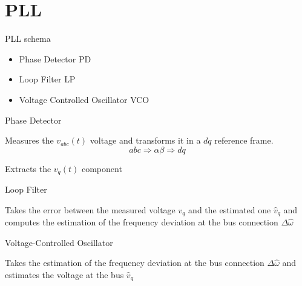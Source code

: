 \documentclass[aspectratio=169, 12pt]{beamer}
\begin{document}
\section{PLL}  
\begin{frame}{PLL schema}{\insertsection}
  \begin{figure}
     
  \end{figure}
\begin{itemize}
  \item Phase Detector \textcolor{NTNUBlue}{PD}
  \item Loop Filter \textcolor{NTNUBlue}{LP}
  \item Voltage Controlled Oscillator \textcolor{NTNUBlue}{VCO}
\end{itemize}
\end{frame}

\begin{frame}{Phase Detector}{\insertsection}
  \begin{figure}
     
  \end{figure}
  Measures the $v_{abc}(t)$ voltage and \textcolor{NTNUBlue}{transforms} it in a $dq$ reference frame.
  \begin{equation*}
    abc \Rightarrow \alpha\beta \Rightarrow dq
  \end{equation*}

  Extracts the $v_q(t)$ component
\end{frame}

\begin{frame}{Loop Filter}{\insertsection}
  \begin{figure}
     
  \end{figure}
 Takes the error between the measured voltage $v_q$ and the estimated one $\hat{v}_q$ and computes the estimation of the frequency deviation at the bus connection $\Delta \hat{\omega}$
\end{frame}

\begin{frame}{Voltage-Controlled Oscillator}{\insertsection}
  \begin{figure}
     
  \end{figure}
 Takes the estimation of the frequency deviation at the bus connection $\Delta \hat{\omega}$  and estimates the voltage at the bus $\hat{v}_q$ 
\end{frame}
      
\end{document}
